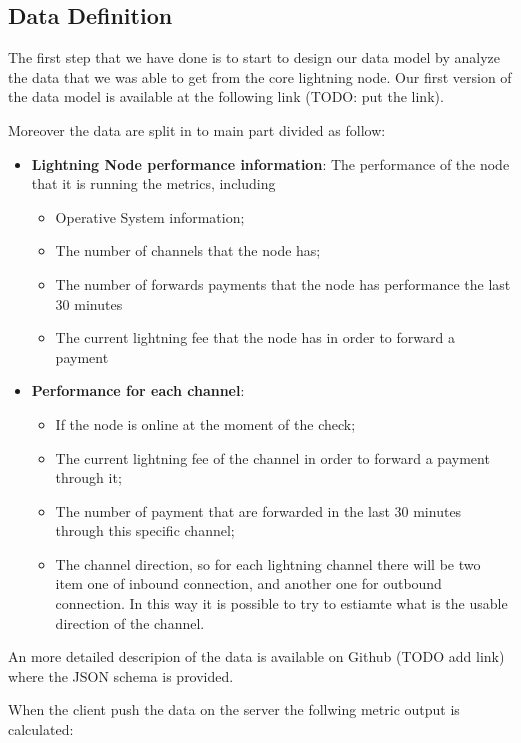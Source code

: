 \subsection{Data Definition}

The first step that we have done is to start to design our data model by analyze
the data that we was able to get from the core lightning node. Our first version
of the data model is available at the following link (TODO: put the link). 

Moreover the data are split in to main part divided as follow:

\begin{itemize}
    \item {\bf Lightning Node performance information}: The performance of the node that it is running
        the metrics, including
        \begin{itemize}
           \item Operative System information;
           \item The number of channels that the node has;
           \item The number of forwards payments that the node has performance the last 30 minutes
           \item The current lightning fee that the node has in order to forward a payment
        \end{itemize}
    \item {\bf Performance for each channel}:
    \begin{itemize}
        \item If the node is online at the moment of the check;
        \item The current lightning fee of the channel in order to forward a payment through it;
        \item The number of payment that are forwarded in the last 30 minutes through this specific 
            channel;
        \item The channel direction, so for each lightning channel there will be two item one of inbound connection, 
            and another one for outbound connection. In this way it is possible to try to estiamte what is the 
            usable direction of the channel.
    \end{itemize}
\end{itemize}

An more detailed descripion of the data is available on Github (TODO add link) where the
JSON schema is provided.

When the client push the data on the server the follwing metric output is calculated:

